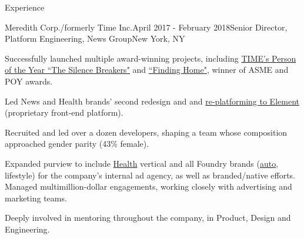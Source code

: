 \documentclass{resume} %
\begin{document}
\begin{rSection}{Experience}

\begin{rSubsection}{Meredith Corp./formerly Time Inc.}{April 2017 - February 2018}{Senior Director, Platform Engineering, News Group}{New York, NY}
\item Successfully launched multiple award-winning projects, including  \href{http://time.com/time-person-of-the-year-2017-silence-breakers/}{TIME's Person of the Year ``The Silence Breakers"} and \href{http://time.com/finding-home/}{``Finding Home"}, winner of ASME and POY awards.
\item Led News and Health brands' second redesign and and \href{https://medium.com/@acharalambides/element-the-digital-unification-of-time-inc-979656149fd3}{re-platforming to Element} (proprietary front-end platform).
\item Recruited and led over a dozen developers, shaping a team whose composition approached gender parity (43\% female).
\item Expanded purview to include \href{http://www.health.com}{Health} vertical and all Foundry brands (\href{http://thedrive.com}{auto}, lifestyle) for the company's internal ad agency, as well as branded/native efforts. Managed multimillion-dollar engagements, working closely with advertising and marketing teams.
\item Deeply involved in mentoring throughout the company, in Product, Design and Engineering. 
\end{rSubsection}



\end{rSection}
\end{document}

